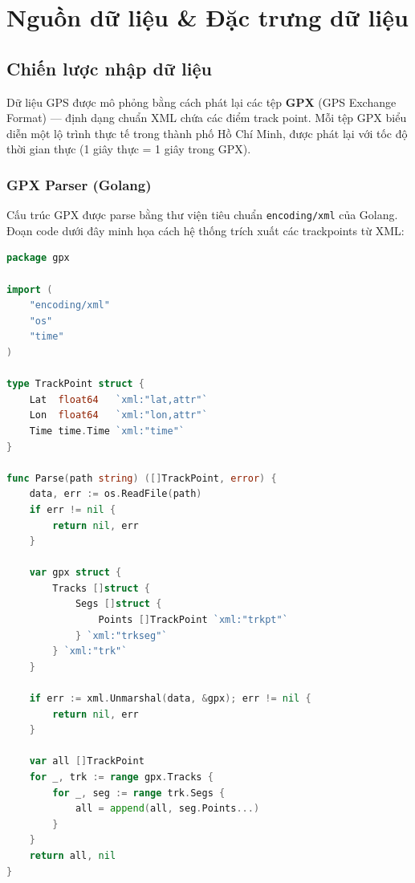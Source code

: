\section{Nguồn dữ liệu \& Đặc trưng dữ liệu}
\label{sec:data-sources}

\subsection{Chiến lược nhập dữ liệu}
\label{sec:ingestion-strategy}

Dữ liệu GPS được mô phỏng bằng cách phát lại các tệp \textbf{GPX} (GPS Exchange Format) — định dạng chuẩn XML chứa các điểm track point. Mỗi tệp GPX biểu diễn một lộ trình thực tế trong thành phố Hồ Chí Minh, được phát lại với tốc độ thời gian thực (1 giây thực = 1 giây trong GPX).

\subsubsection{GPX Parser (Golang)}
Cấu trúc GPX được parse bằng thư viện tiêu chuẩn \texttt{encoding/xml} của Golang. Đoạn code dưới đây minh họa cách hệ thống trích xuất các trackpoints từ XML:

\begin{lstlisting}[language=Go, caption={GPX Parser — \texttt{internal/gpx/parser.go}}, label={lst:gpx-parser}]
package gpx

import (
    "encoding/xml"
    "os"
    "time"
)

type TrackPoint struct {
    Lat  float64   `xml:"lat,attr"`
    Lon  float64   `xml:"lon,attr"`
    Time time.Time `xml:"time"`
}

func Parse(path string) ([]TrackPoint, error) {
    data, err := os.ReadFile(path)
    if err != nil {
        return nil, err
    }

    var gpx struct {
        Tracks []struct {
            Segs []struct {
                Points []TrackPoint `xml:"trkpt"`
            } `xml:"trkseg"`
        } `xml:"trk"`
    }

    if err := xml.Unmarshal(data, &gpx); err != nil {
        return nil, err
    }

    var all []TrackPoint
    for _, trk := range gpx.Tracks {
        for _, seg := range trk.Segs {
            all = append(all, seg.Points...)
        }
    }
    return all, nil
}
\end{lstlisting}

